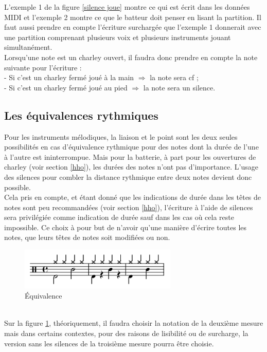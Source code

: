 L’exemple 1 de la figure \ref{silence joue} montre ce qui est écrit dans les données MIDI et l’exemple 2 montre ce que le batteur doit penser en lisant la partition. Il faut aussi prendre en compte l’écriture surchargée que l’exemple 1 donnerait avec une partition comprenant plusieurs voix et plusieurs instruments jouant simultanément.\\
Lorsqu’une note est un charley ouvert, il faudra donc prendre en compte la note suivante pour l’écriture :\\
- Si c’est un charley fermé joué à la main $\Rightarrow$ la note sera cf ;\\
- Si c’est un charley fermé joué au pied $\Rightarrow$ la note sera un silence.
\subsection*{Les équivalences rythmiques}
Pour les instruments mélodiques, la liaison et le point sont les deux seules possibilités en cas d’équivalence rythmique pour des notes dont la durée de l’une à l’autre est ininterrompue. Mais pour la batterie, à part pour les ouvertures de charley (voir section \ref{hho}), les durées des notes n’ont pas d’importance. L’usage des silences pour combler la distance rythmique entre deux notes devient donc possible.\\
Cela pris en compte, et étant donné que les indications de durée dans les têtes de notes sont peu recommandées (voir section \ref{hho}), l’écriture à l’aide de silences sera privilégiée comme indication de durée sauf dans les cas où cela reste impossible. Ce choix à pour but de n’avoir qu’une manière d’écrire toutes les notes, que leurs têtes de notes soit modifiées ou non.
\begin{figure}[h]
	\centering
	\includegraphics[height=20mm, width=75mm]{z_images/3_methodes/0_notation_de_la_batterie/6_equivalence.png}
	\caption{Équivalence}
	\label{equivalence}
\end{figure}\\
Sur la figure \ref{equivalence}, théoriquement, il faudra choisir la notation de la deuxième mesure mais dans certains contextes, pour des raisons de lisibilité ou de surcharge, la version sans les silences de la troisième mesure pourra être choisie.
